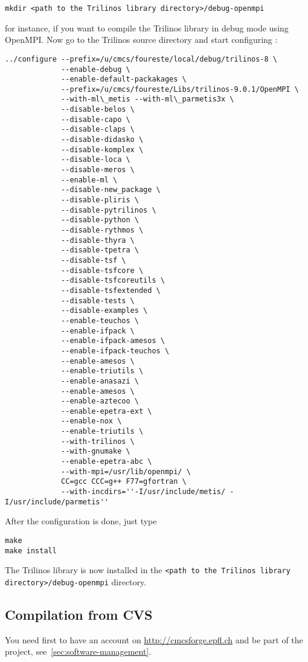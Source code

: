 \begin{verbatim}
mkdir <path to the Trilinos library directory>/debug-openmpi
\end{verbatim}

for instance, if you want to compile the Trilinos library in debug mode using OpenMPI.
Now go to the Trilinos source directory and start configuring :

\begin{verbatim}
../configure --prefix=/u/cmcs/foureste/local/debug/trilinos-8 \
             --enable-debug \
             --enable-default-packakages \
             --prefix=/u/cmcs/foureste/Libs/trilinos-9.0.1/OpenMPI \
             --with-ml\_metis --with-ml\_parmetis3x \
             --disable-belos \
             --disable-capo \
             --disable-claps \
             --disable-didasko \
             --disable-komplex \
             --disable-loca \
             --disable-meros \
             --enable-ml \
             --disable-new_package \
             --disable-pliris \
             --disable-pytrilinos \
             --disable-python \
             --disable-rythmos \
             --disable-thyra \
             --disable-tpetra \
             --disable-tsf \
             --disable-tsfcore \
             --disable-tsfcoreutils \
             --disable-tsfextended \
             --disable-tests \
             --disable-examples \
             --enable-teuchos \
             --enable-ifpack \
             --enable-ifpack-amesos \
             --enable-ifpack-teuchos \
             --enable-amesos \
             --enable-triutils \
             --enable-anasazi \
             --enable-amesos \
             --enable-aztecoo \
             --enable-epetra-ext \
             --enable-nox \
             --enable-triutils \
             --with-trilinos \
             --with-gnumake \
             --enable-epetra-abc \
             --with-mpi=/usr/lib/openmpi/ \
             CC=gcc CCC=g++ F77=gfortran \
             --with-incdirs=''-I/usr/include/metis/ -I/usr/include/parmetis''
\end{verbatim}
After the configuration is done, just type

\begin{verbatim}
make
make install
\end{verbatim}
The Trilinos library is now installed in the \verb!<path to the Trilinos library directory>/debug-openmpi! directory.

\subsection{Compilation from CVS}
\label{sec:compile-cvs}
You need first to have an account on \url{http://cmcsforge.epfl.ch} and
be part of the \lifev project, see~\ref{sec:software-management}.

